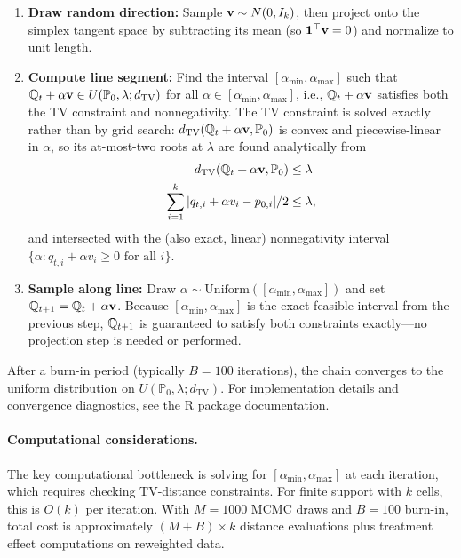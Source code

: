 \documentclass{article}
\newcommand{\PP}{\mathbb{P}}
\begin{document}
\begin{enumerate}
    \item \textbf{Draw random direction:} Sample $\mathbf{v} \sim N(0, I_k)$, then project onto the
    simplex tangent space by subtracting its mean (so $\mathbf{1}^\top \mathbf{v} = 0$) and normalize
    to unit length.
    \item \textbf{Compute line segment:} Find the interval $[\alpha_{\min}, \alpha_{\max}]$ such
    that $\Q_t + \alpha \bv \in U(\PP_0, \lambda; d_{\mathrm{TV}})$ for all
    $\alpha \in [\alpha_{\min}, \alpha_{\max}]$, i.e., $\mathbb{Q}_t + \alpha \mathbf{v}$ satisfies both the TV
    constraint and nonnegativity. The TV constraint is solved exactly rather than by grid search:
    $d_{\mathrm{TV}}(\Q_t + \alpha \bv, \PP_0)$ is convex and piecewise-linear in $\alpha$, so its
    at-most-two roots at $\lambda$ are found analytically from
    \begin{align*}
        d_{\mathrm{TV}}(\Q_t + \alpha \bv, \PP_0) &\leq \lambda\\
        \sum_{i=1}^k |q_{t,i} + \alpha v_i - p_{0,i}| / 2 &\leq \lambda,
    \end{align*}
    and intersected with the (also exact, linear) nonnegativity interval
    $\{\alpha : q_{t,i} + \alpha v_i \geq 0 \text{ for all } i\}$.
    \item \textbf{Sample along line:} Draw $\alpha \sim \text{Uniform}([\alpha_{\min}, \alpha_{\max}])$
    and set $\mathbb{Q}_{t+1} = \mathbb{Q}_t + \alpha \mathbf{v}$. Because $[\alpha_{\min}, \alpha_{\max}]$ is the exact
    feasible interval from the previous step, $\mathbb{Q}_{t+1}$ is guaranteed to satisfy both
    constraints exactly---no projection step is needed or performed.
\end{enumerate}

After a burn-in period (typically $B = 100$ iterations), the chain converges to the uniform distribution on $U(\PP_0, \lambda; d_{\mathrm{TV}})$. For implementation details and convergence diagnostics, see the R package documentation.

\paragraph{Computational considerations.}
The key computational bottleneck is solving for $[\alpha_{\min}, \alpha_{\max}]$ at each iteration, which requires checking TV-distance constraints. For finite support with $k$ cells, this is $O(k)$ per iteration. With $M = 1000$ MCMC draws and $B = 100$ burn-in, total cost is approximately $(M + B) \times k$ distance evaluations plus treatment effect computations on reweighted data.
\end{document}
